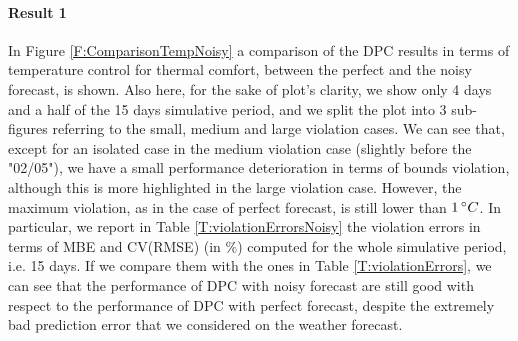 \textcolor[rgb]{0,0,1}{\paragraph{Result 1} In Figure \ref{F:ComparisonTempNoisy} a comparison of the DPC results in terms of temperature control for thermal comfort, between the perfect and the noisy forecast, is shown.
Also here, for the sake of plot's clarity, we show only 4 days and a half of the 15 days simulative period, and we split the plot into 3 sub-figures referring to the small, medium and large violation cases.
We can see that, except for an isolated case in the medium violation case (slightly before the "02/05"), we have a small performance deterioration in terms of bounds violation, although this is more highlighted in the large violation case.
However, the maximum violation, as in the case of perfect forecast, is still lower than $1\,\degree C$.
In particular, we report in Table \ref{T:violationErrorsNoisy} the violation errors in terms of MBE and CV(RMSE) (in $\%$) computed for the whole simulative period, i.e. 15 days.
If we compare them with the ones in Table \ref{T:violationErrors}, we can see that the performance of DPC with noisy forecast are still good with respect to the performance of DPC with perfect forecast, despite the extremely bad prediction error that we considered on the weather forecast.
}
